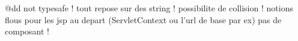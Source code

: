 





@dd
not typesafe !
tout repose sur des string !
possibilite de collision !
notions flous pour les jsp  au depart (ServletContext ou l'url de base par ex)
pas de composant !